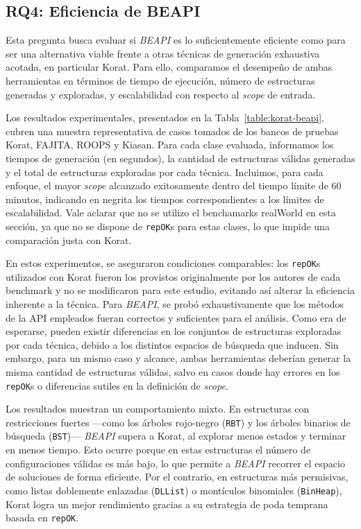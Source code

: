 

\subsection{RQ4: Eficiencia de BEAPI}

Esta pregunta busca evaluar si \emph{BEAPI} es lo suficientemente eficiente como para ser una 
alternativa viable frente a otras técnicas de generación exhaustiva acotada, en particular 
\textsf{Korat}. Para ello, comparamos el desempeño de ambas herramientas en términos de tiempo 
de ejecución, número de estructuras generadas y exploradas, y escalabilidad con respecto al 
\emph{scope} de entrada.

Los resultados experimentales, presentados en la Tabla~\ref{table:korat-beapi}, cubren una muestra 
representativa de casos tomados de los bancos de pruebas \textsf{Korat}, \textsf{FAJITA}, 
\textsf{ROOPS} y \textsf{Kiasan}. Para cada clase evaluada, informamos los tiempos de generación 
(en segundos), la cantidad de estructuras válidas generadas y el total de estructuras exploradas 
por cada técnica. Incluimos, para cada enfoque, el mayor \emph{scope} alcanzado exitosamente dentro 
del tiempo límite de 60 minutos, indicando en negrita los tiempos correspondientes a los límites 
de escalabilidad. Vale aclarar que no se utilizo el benchamarks \textsf{realWorld} en esta sección, ya que
no se dispone de \texttt{repOK}s para estas clases, lo que impide una comparación justa con \textsf{Korat}.

En estos experimentos, se aseguraron condiciones comparables: los \texttt{repOK}s utilizados con 
\textsf{Korat} fueron los provistos originalmente por los autores de cada benchmark y no se 
modificaron para este estudio, evitando así alterar la eficiencia inherente a la técnica. 
Para \emph{BEAPI}, se probó exhaustivamente que los métodos de la API empleados fueran correctos 
y suficientes para el análisis. Como era de esperarse, pueden existir diferencias en los conjuntos 
de estructuras exploradas por cada técnica, debido a los distintos espacios de búsqueda que inducen. 
Sin embargo, para un mismo caso y alcance, ambas herramientas deberían generar la misma cantidad 
de estructuras válidas, salvo en casos donde hay errores en los \texttt{repOK}s o diferencias sutiles 
en la definición de \emph{scope}.

Los resultados muestran un comportamiento mixto. En estructuras con restricciones fuertes —como los 
árboles rojo-negro (\texttt{RBT}) y los árboles binarios de búsqueda (\texttt{BST})— \emph{BEAPI} 
supera a \textsf{Korat}, al explorar menos estados y terminar en menos tiempo. Esto ocurre porque 
en estas estructuras el número de configuraciones válidas es más bajo, lo que permite a \emph{BEAPI} 
recorrer el espacio de soluciones de forma eficiente. Por el contrario, en estructuras más permisivas, 
como listas doblemente enlazadas (\texttt{DLList}) o montículos binomiales (\texttt{BinHeap}), 
\textsf{Korat} logra un mejor rendimiento gracias a su estrategia de poda temprana basada en 
\texttt{repOK}.

